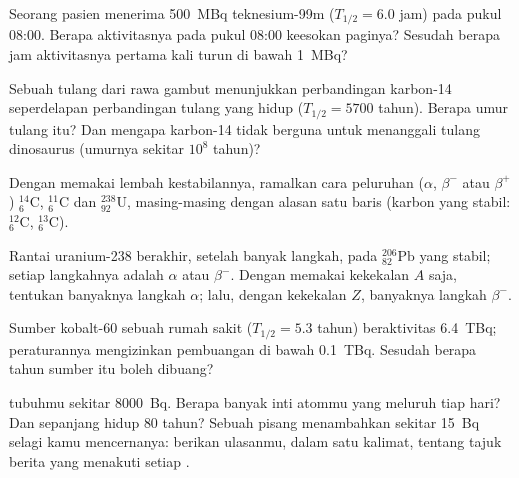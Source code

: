 \begin{exercise}[$\star\star$]\label{exo:g11:nucleus-radioactivity:9}
Seorang pasien menerima \qty{500}{MBq} teknesium-99m ($T_{1/2} = 6.0$ jam)
pada pukul 08:00. Berapa aktivitasnya pada pukul 08:00 keesokan paginya?
Sesudah berapa jam aktivitasnya pertama kali turun di bawah \qty{1}{MBq}?
\end{exercise}

\begin{exercise}[$\star\star$]\label{exo:g11:nucleus-radioactivity:10}
Sebuah tulang dari rawa gambut menunjukkan perbandingan karbon-14
seperdelapan perbandingan tulang yang hidup ($T_{1/2} = \num{5700}$ tahun).
Berapa umur tulang itu? Dan mengapa karbon-14 tidak berguna untuk
menanggali tulang dinosaurus (umurnya sekitar $10^{8}$ tahun)?
\end{exercise}

\begin{exercise}[$\star\star$]\label{exo:g11:nucleus-radioactivity:11}
Dengan memakai lembah kestabilannya, ramalkan cara peluruhan ($\alpha$,
$\beta^-$ atau $\beta^+$) ${}^{14}_{6}\mathrm{C}$,
${}^{11}_{6}\mathrm{C}$ dan ${}^{238}_{92}\mathrm{U}$, masing-masing
dengan alasan satu baris (karbon yang stabil: ${}^{12}_{6}\mathrm{C}$,
${}^{13}_{6}\mathrm{C}$).
\end{exercise}

\begin{exercise}[$\star\star\star$]\label{exo:g11:nucleus-radioactivity:12}
Rantai uranium-238 berakhir, setelah banyak langkah, pada
${}^{206}_{82}\mathrm{Pb}$ yang stabil; setiap langkahnya adalah $\alpha$
atau $\beta^-$. Dengan memakai kekekalan $A$ saja, tentukan banyaknya
langkah $\alpha$; lalu, dengan kekekalan $Z$, banyaknya langkah $\beta^-$.
\end{exercise}

\begin{exercise}[$\star\star\star$]\label{exo:g11:nucleus-radioactivity:13}
Sumber kobalt-60 sebuah rumah sakit ($T_{1/2} = 5.3$ tahun) beraktivitas
\qty{6.4}{TBq}; peraturannya mengizinkan pembuangan di bawah
\qty{0.1}{TBq}. Sesudah berapa tahun sumber itu boleh dibuang?
\end{exercise}

\begin{exercise}[$\star\star\star$]\label{exo:g11:nucleus-radioactivity:14}
 tubuhmu sekitar \qty{8000}{Bq}. Berapa banyak inti atommu yang
meluruh tiap hari? Dan sepanjang hidup $80$ tahun? Sebuah pisang menambahkan
sekitar \qty{15}{Bq} selagi kamu mencernanya: berikan ulasanmu, dalam satu
kalimat, tentang tajuk berita yang menakuti setiap .
\end{exercise}

